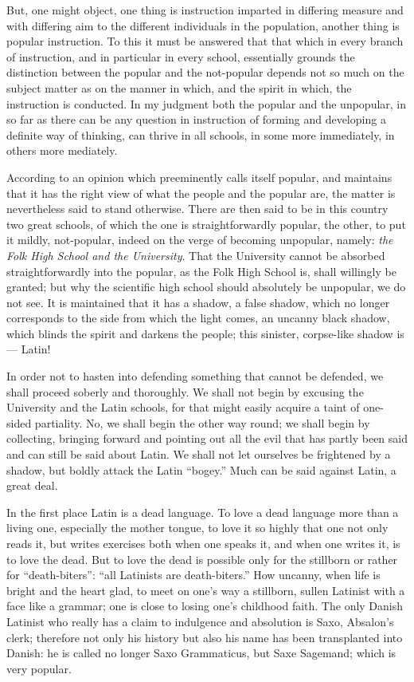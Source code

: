 \documentclass[12pt,a4paper,openany]{book}
\newcommand{\opage}[1]{\marginnote{\footnotesize\textit{[#1]}}}
\newcounter{lect}
\begin{document}
But, one might object, one thing is instruction
imparted in differing measure and with differing aim
to the different individuals in the population, another thing is
popular instruction. To this it must be answered that that
which in every branch of instruction, and in particular in every
school, essentially grounds the distinction between the popular
and the not-popular depends not so much on the subject matter
as on the manner in which, and the spirit
in which, the instruction is conducted. In my judgment both
the popular and the unpopular, in so far as
there can be any question in instruction of forming
\setcounter{footnote}{0}%
\opage{122}and developing a definite way of thinking, can thrive in all schools,
in some more immediately, in others more mediately.

According to an opinion which preeminently calls itself
popular, and maintains that it has the right view of what
the people and the popular are, the matter is nevertheless said
to stand otherwise. There are then said to be in this country
two great schools, of which the one is straightforwardly
popular, the other, to put it mildly, not-popular, indeed on the
verge of becoming unpopular, namely: \emph{the Folk High School
and the University}. That the University cannot
be absorbed straightforwardly into the popular, as the
Folk High School is, shall willingly be granted; but why the
scientific high school should absolutely be unpopular,
we do not see. It is maintained that it has a shadow,
a false shadow, which no longer corresponds to the side
from which the light comes, an uncanny black shadow, which
blinds the spirit and darkens the people; this sinister, corpse-like
shadow is --- Latin!

In order not to hasten into defending something
that cannot be defended, we shall proceed soberly and
thoroughly. We shall not begin by excusing
the University and the Latin schools, for that might easily acquire
a taint of one-sided partiality. No, we shall begin
the other way round; we shall begin by collecting, bringing forward
and pointing out all the evil that has partly been said and
can still be said about Latin. We shall not let ourselves be
frightened by a shadow, but boldly attack the Latin
``bogey.'' Much can be said against Latin,
a great deal.

In the first place Latin is a dead language. To
love a dead language more than a living one, especially the mother
\setcounter{footnote}{0}%
\opage{123}tongue, to love it so highly that one not only reads
it, but writes exercises both when one speaks it, and when
one writes it, is to love the dead. But to love
the dead is possible only for the stillborn or rather
for ``death-biters'': ``all Latinists are death-biters.'' How
uncanny, when life is bright and the heart glad, to meet
on one's way a stillborn, sullen Latinist with a face
like a grammar; one is close to losing one's
childhood faith. The only Danish Latinist who really has
a claim to indulgence and absolution is Saxo, Absalon's
clerk; therefore not only his history but also
his name has been transplanted into Danish: he is called
no longer Saxo Grammaticus, but Saxe Sagemand;
which is very popular.
\end{document}
